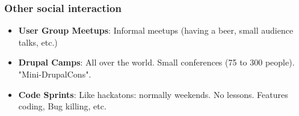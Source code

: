 \begin{frame}[allowframebreaks]
\frametitle{Other social interaction}
\begin{itemize}
\item \textbf{User Group Meetups}: Informal meetups (having a beer, small audience talks, etc.)
\item \textbf{Drupal Camps}: All over the world. Small conferences (75 to 300 people). "Mini-DrupalCons".
\item \textbf{Code Sprints}: Like hackatons: normally weekends. No lessons. Features coding, Bug killing, etc.
\end{itemize}

\end{frame}
